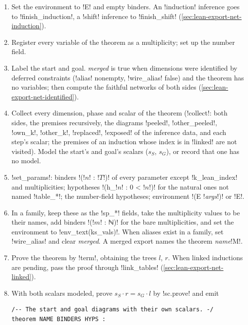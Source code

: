 {\begin{algorithm}[\py!finish!]\label{alg:lean-export-net-finish}
\begin{enumerate}
\item Set the environment to \code!E! and empty binders. An \code!induction! inference goes to
  \py!finish_induction!, a \code!shift! inference to \py!finish_shift!
  (\cref{sec:lean-export-net-induction}).
\item Register every variable of the theorem as a multiplicity; set up the number field.
\item Label the start and goal. \textit{merged} is true when dimensions were identified by
  deferred constraints (\py!alias! nonempty, \py!wire_alias! false) and the theorem has no
  variables; then compute the faithful networks of both sides (\cref{sec:lean-export-net-identified}).
\item Collect every dimension, phase and scalar of the theorem (\py!collect!: both sides, the
  premises recursively, the diagrams \code!peeled!, \code!other_peeled!, \code!own_k!,
  \code!other_k!, \code!replaced!, \code!exposed! of the inference data, and each step's scalar;
  the premises of an induction whose index is in \py!linked! are not visited).
  Model the start's and goal's scalars ($s_S$, $s_G$), or record that one has no model.
\item \py!set_params!: binders \code!(!$n$\code! : !$T$\code!)! of every parameter except
  \code!k_lean_index! and multiplicities; hypotheses \code!(h_!$n$\code! : 0 < !$n$\code!)! for
  the natural ones not named \code!table_*!; the number-field hypotheses; environment
  \code!(E !\textit{args}\code!)! or \code!E!.
\item In a family, keep these as the \code!sp_*! fields, take the multiplicity values to be their
  names, add binders \code!(!$m$\code! : ℕ)! for the bare multiplicities, and set the environment
  to \py!env_text(ks_vals)!. When aliases exist in a family, set \py!wire_alias! and clear
  \textit{merged}. A merged export names the theorem \textit{name}\code!M!.
\item Prove the theorem by \py!term!, obtaining the trees $l$, $r$. When linked inductions are
  pending, pass the proof through \py!link_tables! (\cref{sec:lean-export-net-linked}).
\item With both scalars modeled, prove $s_S\cdot r = s_G\cdot l$ by \py!sc.prove! and emit
\begin{lstlisting}[style=grammar]
/-- The start and goal diagrams with their own scalars. -/
theorem NAME BINDERS HYPS :

\end{lstlisting}
\end{enumerate}
\end{algorithm}}
